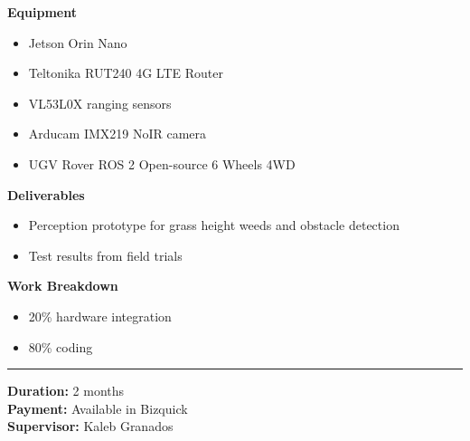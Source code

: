 \documentclass{article}%
\begin{document}
\textbf{Equipment}%
\begin{itemize}[leftmargin=*,itemsep=2pt,topsep=0pt,parsep=0pt,partopsep=0pt]%
\item Jetson Orin Nano%
\item Teltonika RUT240 4G LTE Router%
\item VL53L0X ranging sensors%
\item Arducam IMX219 NoIR camera%
\item UGV Rover ROS 2 Open{-}source 6 Wheels 4WD%
\end{itemize}%
\textbf{Deliverables}%
\begin{itemize}[leftmargin=*,itemsep=2pt,topsep=0pt,parsep=0pt,partopsep=0pt]%
\item Perception prototype for grass height weeds and obstacle detection%
\item Test results from field trials%
\end{itemize}%
\textbf{Work Breakdown}%
\begin{itemize}[leftmargin=*,itemsep=2pt,topsep=0pt,parsep=0pt,partopsep=0pt]%
\item 20\% hardware integration%
\item 80\% coding%
\end{itemize}%
\vspace{6pt}\hrule\vspace{8pt}%
\textbf{Duration:} 2 months\\[4pt]%
\textbf{Payment:} Available in Bizquick\\[4pt]%
\textbf{Supervisor:} Kaleb Granados%
\end{document}
